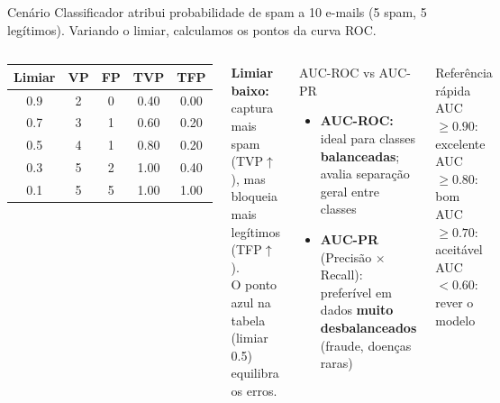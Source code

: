 \documentclass[aspectratio=169]{beamer}
\begin{document}
\begin{frame}{}
  \vspace{-0.75cm}
\begin{block}{Cenário}
  \footnotesize
  Classificador atribui probabilidade de spam a 10 e-mails (5 spam, 5 legítimos). Variando o limiar, calculamos os pontos da curva ROC.
\end{block}
\vspace{0.3em}
\begin{columns}[T]
\begin{center}\footnotesize
\renewcommand{\arraystretch}{1.3}
\begin{tabular}{ccccc}
\toprule
\textbf{Limiar} & \textbf{VP} & \textbf{FP} & \textbf{TVP} & \textbf{TFP} \\
\midrule
0.9 & 2 & 0 & 0.40 & 0.00 \\
0.7 & 3 & 1 & 0.60 & 0.20 \\
\rowcolor{mineblue!12}
0.5 & 4 & 1 & 0.80 & 0.20 \\
0.3 & 5 & 2 & 1.00 & 0.40 \\
0.1 & 5 & 5 & 1.00 & 1.00 \\
\bottomrule
\end{tabular}
\end{center}
\vspace{0.2em}
\begin{alertblock}{}
  \footnotesize
  \textbf{Limiar baixo:} captura mais spam (TVP$\uparrow$), mas bloqueia mais legítimos (TFP$\uparrow$).\\[3pt]
  O ponto azul na tabela (limiar 0.5) equilibra os erros.
\end{alertblock}
\begin{block}{AUC-ROC vs AUC-PR}
  \begin{itemize}\footnotesize
    \item \textbf{AUC-ROC:} ideal para classes \textbf{balanceadas}; avalia separação geral entre classes
    \item \textbf{AUC-PR} (Precisão $\times$ Recall): preferível em dados \textbf{muito desbalanceados} (fraude, doenças raras)
  \end{itemize}
\end{block}
\vspace{0.3em}
\begin{exampleblock}{Referência rápida}
  \footnotesize
  AUC $\geq 0.90$: excelente\\
  AUC $\geq 0.80$: bom\\
  AUC $\geq 0.70$: aceitável\\
  AUC $< 0.60$: rever o modelo
\end{exampleblock}
\end{columns}
\end{frame}
\end{document}

